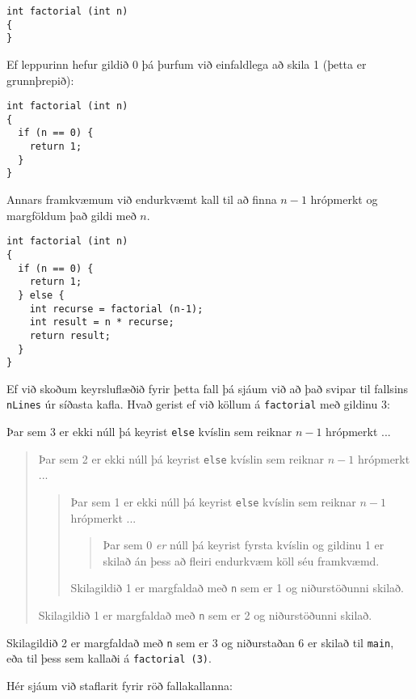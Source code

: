 \begin{verbatim}
int factorial (int n)
{
}
\end{verbatim}
%
Ef leppurinn hefur gildið 0 þá þurfum við einfaldlega að skila 1 (þetta er grunnþrepið):

\begin{verbatim}
int factorial (int n)
{
  if (n == 0) {
    return 1;
  }
}
\end{verbatim}
%
Annars framkvæmum við endurkvæmt kall til að finna $n-1$ hrópmerkt og margföldum það gildi með $n$.

\begin{verbatim}
int factorial (int n)
{
  if (n == 0) {
    return 1;
  } else {
    int recurse = factorial (n-1);
    int result = n * recurse;
    return result;
  }
}
\end{verbatim}
%
Ef við skoðum keyrsluflæðið fyrir þetta fall þá sjáum við að það svipar til fallsins {\tt nLines} úr síðasta kafla.
Hvað gerist ef við köllum á {\tt factorial} með gildinu 3:

Þar sem 3 er ekki núll þá keyrist {\tt else} kvíslin sem reiknar $n-1$ hrópmerkt ...

\begin{quote}
Þar sem 2 er ekki núll þá keyrist {\tt else} kvíslin sem reiknar $n-1$ hrópmerkt ...

\begin{quote}
Þar sem 1 er ekki núll þá keyrist {\tt else} kvíslin sem reiknar $n-1$ hrópmerkt ...

\begin{quote}
Þar sem 0 {\em er} núll þá keyrist fyrsta kvíslin og gildinu 1 er skilað án þess að fleiri endurkvæm köll séu framkvæmd.

\end{quote}

Skilagildið 1 er margfaldað með {\tt n} sem er 1 og niðurstöðunni skilað.

\end{quote}

Skilagildið 1 er margfaldað með {\tt n} sem er 2 og niðurstöðunni skilað.

\end{quote}

\noindent Skilagildið 2 er margfaldað með {\tt n} sem er 3 og niðurstaðan 6 er skilað til {\tt main}, eða til þess sem kallaði á {\tt factorial (3)}.


Hér sjáum við staflarit fyrir röð fallakallanna:

